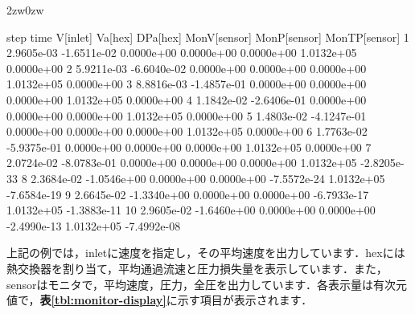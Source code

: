 \begin{indentation}{2zw}{0zw}
{\small 
\begin{program}
    step         time    V[inlet]     Va[hex]    DPa[hex]  MonV[sensor]  MonP[sensor] MonTP[sensor]
       1   2.9605e-03 -1.6511e-02  0.0000e+00  0.0000e+00    0.0000e+00    1.0132e+05    0.0000e+00
       2   5.9211e-03 -6.6040e-02  0.0000e+00  0.0000e+00    0.0000e+00    1.0132e+05    0.0000e+00
       3   8.8816e-03 -1.4857e-01  0.0000e+00  0.0000e+00    0.0000e+00    1.0132e+05    0.0000e+00
       4   1.1842e-02 -2.6406e-01  0.0000e+00  0.0000e+00    0.0000e+00    1.0132e+05    0.0000e+00
       5   1.4803e-02 -4.1247e-01  0.0000e+00  0.0000e+00    0.0000e+00    1.0132e+05    0.0000e+00
       6   1.7763e-02 -5.9375e-01  0.0000e+00  0.0000e+00    0.0000e+00    1.0132e+05    0.0000e+00
       7   2.0724e-02 -8.0783e-01  0.0000e+00  0.0000e+00    0.0000e+00    1.0132e+05   -2.8205e-33
       8   2.3684e-02 -1.0546e+00  0.0000e+00  0.0000e+00   -7.5572e-24    1.0132e+05   -7.6584e-19
       9   2.6645e-02 -1.3340e+00  0.0000e+00  0.0000e+00   -6.7933e-17    1.0132e+05   -1.3883e-11
      10   2.9605e-02 -1.6460e+00  0.0000e+00  0.0000e+00   -2.4990e-13    1.0132e+05   -7.4992e-08
\end{program}
}

上記の例では，inletに速度を指定し，その平均速度を出力しています．hexには熱交換器を割り当て，平均通過流速と圧力損失量を表示しています．また，sensorはモニタで，平均速度，圧力，全圧を出力しています．各表示量は有次元値で，\textbf{表\ref{tbl:monitor-display}}に示す項目が表示されます．


\end{indentation}
